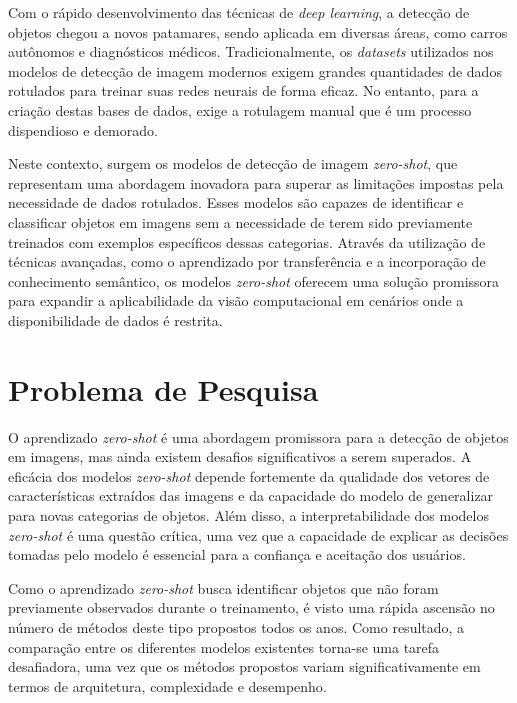 \documentclass[openany, a4paper,12pt, oneside]{article}
\begin{document}
Com o r\'{a}pido desenvolvimento das t\'{e}cnicas de \textit{deep learning}, a detec\c{c}\~{a}o de objetos chegou a novos patamares\cite{nature14539}, sendo aplicada em diversas \'{a}reas, como carros aut\^{o}nomos \cite{cordts2016} e diagn\'{o}sticos m\'{e}dicos\cite{dong2017}. Tradicionalmente, os \textit{datasets} utilizados nos modelos de detecção de imagem modernos exigem grandes quantidades de dados rotulados para treinar suas redes neurais de forma eficaz. No entanto, para a cria\c{c}\~{a}o destas bases de dados, exige a rotulagem manual que é um processo dispendioso e demorado\cite{shankar2017}\cite{cordts2016}.

Neste contexto, surgem os modelos de detecção de imagem \textit{zero-shot}, que representam uma abordagem inovadora para superar as limitações impostas pela necessidade de dados rotulados. Esses modelos são capazes de identificar e classificar objetos em imagens sem a necessidade de terem sido previamente treinados com exemplos específicos dessas categorias\cite{Bansal_2018_ECCV}. Através da utilização de técnicas avançadas, como o aprendizado por transferência\cite{Qi2011}\cite{fu2017} e a incorporação de conhecimento semântico\cite{joulin2016}\cite{mikolov2013}, os modelos \textit{zero-shot} oferecem uma solução promissora para expandir a aplicabilidade da visão computacional em cenários onde a disponibilidade de dados é restrita.

\section{Problema de Pesquisa}

O aprendizado \textit{zero-shot} é uma abordagem promissora para a detecção de objetos em imagens, mas ainda existem desafios significativos a serem superados. A eficácia dos modelos \textit{zero-shot} depende fortemente da qualidade dos vetores de características extraídos das imagens e da capacidade do modelo de generalizar para novas categorias de objetos. Além disso, a interpretabilidade dos modelos \textit{zero-shot} é uma questão crítica, uma vez que a capacidade de explicar as decisões tomadas pelo modelo é essencial para a confiança e aceitação dos usuários\cite{Bansal_2018_ECCV}.

Como o aprendizado \textit{zero-shot} busca identificar objetos que n\~{a}o foram previamente observados durante o treinamento\cite{lampert2014}\cite{Rohrbach2011}, \'{e} visto uma r\'{a}pida ascens\~{a}o no n\'{u}mero de m\'{e}todos deste tipo propostos todos os anos. Como resultado, a compara\c{c}\~{a}o entre os diferentes modelos existentes torna-se uma tarefa desafiadora, uma vez que os métodos propostos variam significativamente em termos de arquitetura, complexidade e desempenho\cite{xian2020}.
\end{document}
